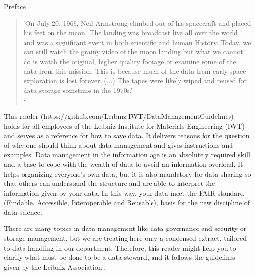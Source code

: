 \thispagestyle{empty}
\begin{center}
  \large\headerfont{}\textcolor{iwtdark}{Preface}
\end{center}

\begin{quote}
  `On July 20, 1969, Neil Armstrong climbed out of his spacecraft and
  placed his feet on the moon. The landing was broadcast live all over the
  world and was a significant event in both scientific and human History.
  Today, we can still watch the grainy video of the moon landing but what we
  cannot do is watch the original, higher quality footage or examine some of
  the data from this mission. This is because much of the data from early space
  exploration is lost forever. (...) The tapes were likely wiped and reused for
  data storage sometime in the 1970s.' \\
  \null\hfill - \citeauthor{briney2015}\cite{briney2015}
\end{quote}

\noindent This reader (https://github.com/Leibniz-IWT/DataManagementGuidelines) holds for all employees of the Leibniz-Institute for Materials Engineering (IWT) and serves as a reference
for how to save data. It delivers reasons for the question of why one should
think about data management and gives instructions and examples. Data management
in the information age is an absolutely required skill and a base to cope with
the wealth of data to avoid an information overload. It helps organizing
everyone’s own data, but it is also mandatory for data sharing so that others
can understand the structure and are able to interpret the information given by
your data. In this way, your data meet the FAIR standard (Findable, Accessible,
Interoperable and Reusable), basis for the new discipline of data science.

There are many topics in data management like data governance and security or
storage management, but we are treating here only a condensed extract, tailored
to data handling in our department. Therefore, this reader might help you to
clarify what must be done to be a data steward, and it follows the guidelines given by the Leibniz Association \cite{leibniz2018}.
